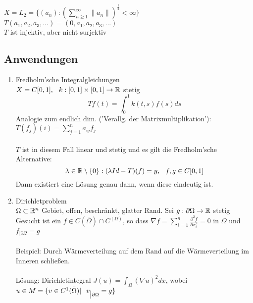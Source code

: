 \begin{beispiel}
$X = L_{2} = \{ (a_{n}): \left( \sum_{n \geq 1}^{\infty} \| a_{n} \| \right)^{\frac{1}{2}} < \infty \}$	\\
$T ( a_{1}, a_{2}, a_{3}, ...) = ( 0, a_{1}, a_{2}, a_{3}, ...)$ \\

$T$ ist injektiv, aber nicht surjektiv
\end{beispiel}


\subsection{Anwendungen}


\begin{enumerate}
	\item Fredholm'sche Integralgleichungen  \\
	$X = C[0, 1], \hspace{0.25cm} k: [0, 1] \times [0, 1] \rightarrow \mathbb{R}$ stetig \\
	\[ Tf(t) = \int_{0}^{1} k(t, s) f(s) ds \]
	Analogie zum endlich dim. ('Verallg. der Matrixmultiplikation'):  $ T(f_{j})(i) = \sum_{j = 1}^{n} a_{ij}f_{j}$ \\ \\
 	$T$ ist in diesem Fall linear und stetig und es gilt die Fredholm'sche Alternative:
	\[ \lambda \in \mathbb{R} \setminus \{0\}: (\lambda Id - T)(f) = y, \hspace{0.25cm} f,g \in C[0, 1] \]
	Dann existiert eine Lösung genau dann, wenn diese eindeutig ist. \\
	\item Dirichletproblem \\
	$\Omega \subset \mathbb{R}^n$ Gebiet, offen, beschränkt, glatter Rand. Sei $g: \partial \Omega \rightarrow \mathbb{R}$ stetig \\ 
	Gesucht ist ein $f \in C(\bar \Omega) \cap  C^(\Omega)$, so dass $\nabla f = \sum_{i = 1}^{n} \frac{\partial^{2} f}{\partial x_{i}^2} = 0$ in $\Omega$ und $f_{\big| \partial \Omega}= g$ \\ \\
	Beispiel: Durch Wärmeverteilung auf dem Rand auf die Wärmeverteilung im Inneren schlie{\ss}en. \\ \\
	Lösung: Dirichletintegral $J(u) = \int_{\Omega} (\nabla u )^{2} dx$, wobei $ u \in M = \{ v \in C^{1}(\bar \Omega) | \hspace{0.25cm} v_{\big| \partial \Omega} = g \}$ \\

\end{enumerate}
